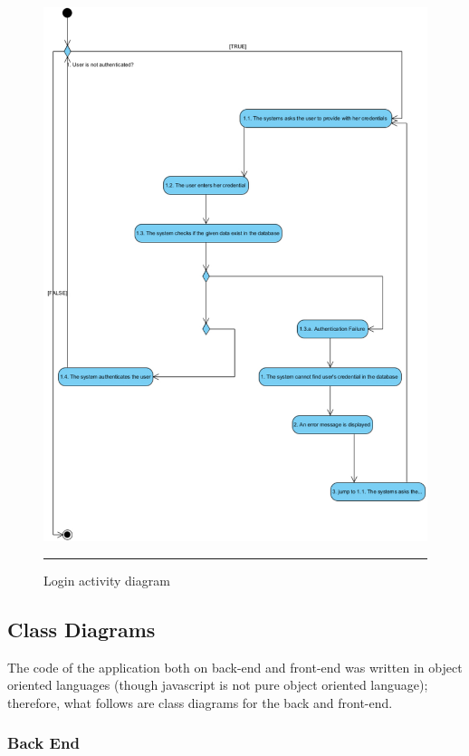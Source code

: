 \begin{figure}[htbp]
	\centering
		\includegraphics[scale=0.50]{./Figures/chapter4/figure5.pdf}
		\rule{35em}{0.5pt}
	\caption[Login activity diagram]{Login activity diagram}
	\label{fig:activityDiagramLogin}
\end{figure}


\subsection{Class Diagrams}

The code of the application both on back-end and front-end was written in object oriented languages (though javascript is not pure object oriented language); therefore, what follows are class diagrams for the back and front-end.

\subsubsection{Back End}

